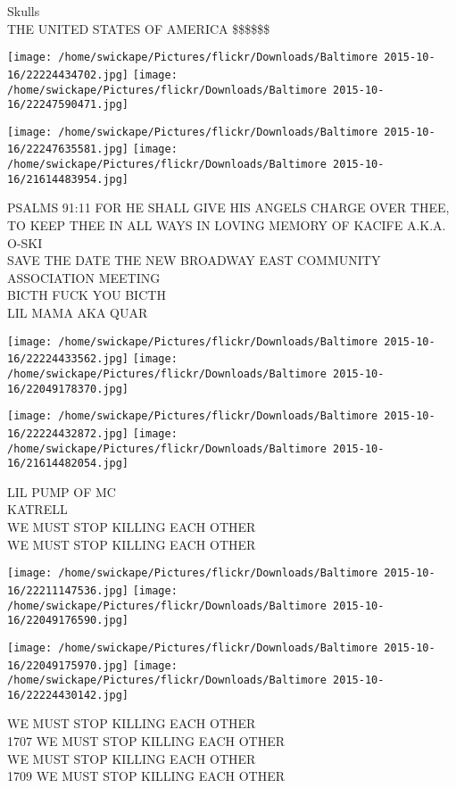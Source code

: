 \documentclass[10pt,letterpaper]{article}
\begin{document}
Skulls\\
THE UNITED STATES OF AMERICA \$\$\$\$\$\$\\
\pagebreak

\texttt{[image: /home/swickape/Pictures/flickr/Downloads/Baltimore 2015-10-16/22224434702.jpg]}
\texttt{[image: /home/swickape/Pictures/flickr/Downloads/Baltimore 2015-10-16/22247590471.jpg]}

\texttt{[image: /home/swickape/Pictures/flickr/Downloads/Baltimore 2015-10-16/22247635581.jpg]}
\texttt{[image: /home/swickape/Pictures/flickr/Downloads/Baltimore 2015-10-16/21614483954.jpg]}

PSALMS 91:11 FOR HE SHALL GIVE HIS ANGELS CHARGE OVER THEE, TO KEEP THEE IN ALL WAYS IN LOVING MEMORY OF KACIFE A.K.A. O{-}SKI\\
SAVE THE DATE THE NEW BROADWAY EAST COMMUNITY ASSOCIATION MEETING\\
BICTH FUCK YOU BICTH\\
LIL MAMA AKA QUAR\\
\pagebreak

\texttt{[image: /home/swickape/Pictures/flickr/Downloads/Baltimore 2015-10-16/22224433562.jpg]}
\texttt{[image: /home/swickape/Pictures/flickr/Downloads/Baltimore 2015-10-16/22049178370.jpg]}

\texttt{[image: /home/swickape/Pictures/flickr/Downloads/Baltimore 2015-10-16/22224432872.jpg]}
\texttt{[image: /home/swickape/Pictures/flickr/Downloads/Baltimore 2015-10-16/21614482054.jpg]}

LIL PUMP OF MC\\
KATRELL\\
WE MUST STOP KILLING EACH OTHER\\
WE MUST STOP KILLING EACH OTHER\\
\pagebreak

\texttt{[image: /home/swickape/Pictures/flickr/Downloads/Baltimore 2015-10-16/22211147536.jpg]}
\texttt{[image: /home/swickape/Pictures/flickr/Downloads/Baltimore 2015-10-16/22049176590.jpg]}

\texttt{[image: /home/swickape/Pictures/flickr/Downloads/Baltimore 2015-10-16/22049175970.jpg]}
\texttt{[image: /home/swickape/Pictures/flickr/Downloads/Baltimore 2015-10-16/22224430142.jpg]}

WE MUST STOP KILLING EACH OTHER\\
1707 WE MUST STOP KILLING EACH OTHER\\
WE MUST STOP KILLING EACH OTHER\\
1709 WE MUST STOP KILLING EACH OTHER\\
\pagebreak
\end{document}
